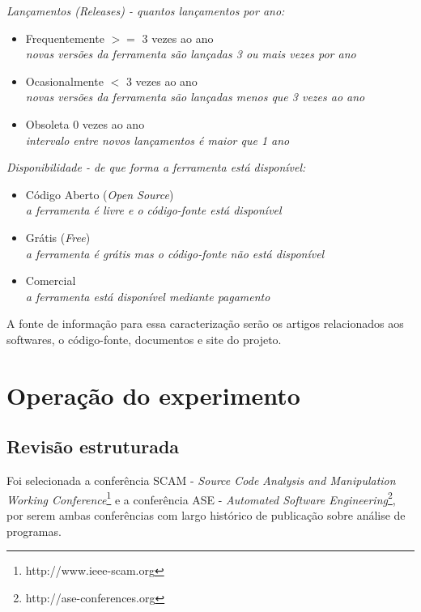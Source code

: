 \begin{description}

  \item {\it Lançamentos ({\it Releases}) - quantos lançamentos por ano:}
    \begin{itemize}
      \item Frequentemente $>=$ 3 vezes ao ano\\
        {\it \small novas versões da ferramenta são lançadas 3 ou mais vezes por ano}
      \item Ocasionalmente $<$ 3 vezes ao ano\\
        {\it \small novas versões da ferramenta são lançadas menos que 3 vezes ao ano}
      \item Obsoleta 0 vezes ao ano\\
        {\it \small intervalo entre novos lançamentos é maior que 1 ano}
    \end{itemize}

  \item {\it Disponibilidade - de que forma a ferramenta está disponível:}
    \begin{itemize}
      \item Código Aberto ({\it Open Source})\\
        {\it \small a ferramenta é livre e o código-fonte está disponível}
      \item Grátis ({\it Free})\\
        {\it \small a ferramenta é grátis mas o código-fonte não está disponível}
      \item Comercial\\
        {\it \small a ferramenta está disponível mediante pagamento}
    \end{itemize}

\end{description}

A fonte de informação para essa caracterização serão os artigos relacionados
aos softwares, o código-fonte, documentos e site do projeto.

\section{Operação do experimento}

\subsection{Revisão estruturada}

Foi selecionada a conferência SCAM - {\it Source Code Analysis and Manipulation Working
Conference}\footnote{http://www.ieee-scam.org} e a conferência ASE - {\it Automated
Software Engineering}\footnote{http://ase-conferences.org}, por serem ambas
conferências com largo histórico de publicação sobre análise de programas.

